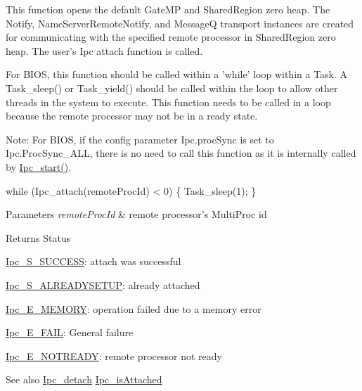 This function opens the default Gate\-M\-P and Shared\-Region zero heap. The Notify, Name\-Server\-Remote\-Notify, and Message\-Q transport instances are created for communicating with the specified remote processor in Shared\-Region zero heap. The user's Ipc attach function is called.

For B\-I\-O\-S, this function should be called within a 'while' loop within a Task. A Task\-\_\-sleep() or Task\-\_\-yield() should be called within the loop to allow other threads in the system to execute. This function needs to be called in a loop because the remote processor may not be in a ready state.

Note\-: For B\-I\-O\-S, if the config parameter Ipc.\-proc\-Sync is set to Ipc.\-Proc\-Sync\-\_\-\-A\-L\-L, there is no need to call this function as it is internally called by \hyperlink{_ipc_8h_aca550c6a5498637cfec7b0f4e6d07828}{Ipc\-\_\-start()}.


\begin{DoxyCode}
    \textcolor{keywordflow}{while} (Ipc_attach(remoteProcId) < 0) \{
        Task\_sleep(1);
    \}
\end{DoxyCode}



\begin{DoxyParams}{Parameters}
{\em remote\-Proc\-Id} & remote processor's Multi\-Proc id\\
\hline
\end{DoxyParams}
\begin{DoxyReturn}{Returns}
Status
\begin{DoxyItemize}
\item \hyperlink{_ipc_8h_a3f2ce5a89194a828588322cb29548360}{Ipc\-\_\-\-S\-\_\-\-S\-U\-C\-C\-E\-S\-S}\-: attach was successful
\item \hyperlink{_ipc_8h_a1cffa46553c4e6cb6d699f9fdadadef8}{Ipc\-\_\-\-S\-\_\-\-A\-L\-R\-E\-A\-D\-Y\-S\-E\-T\-U\-P}\-: already attached
\item \hyperlink{_ipc_8h_a55c40b7f048ac0aaf3b2836101c9dc81}{Ipc\-\_\-\-E\-\_\-\-M\-E\-M\-O\-R\-Y}\-: operation failed due to a memory error
\item \hyperlink{_ipc_8h_a156e22baea9b53fb663a7bb8684022f1}{Ipc\-\_\-\-E\-\_\-\-F\-A\-I\-L}\-: General failure
\item \hyperlink{_ipc_8h_af61be5fb093e7cd7cb076afc8b2fe798}{Ipc\-\_\-\-E\-\_\-\-N\-O\-T\-R\-E\-A\-D\-Y}\-: remote processor not ready
\end{DoxyItemize}
\end{DoxyReturn}
\begin{DoxySeeAlso}{See also}
\hyperlink{_ipc_8h_abd0bc0fb5d84415b441c7050f92826c0}{Ipc\-\_\-detach} \hyperlink{_ipc_8h_a6c17c41b2d25e8b69208082126cde887}{Ipc\-\_\-is\-Attached} 
\end{DoxySeeAlso}
